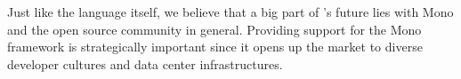 Just like the \fsharp{} language itself, we believe that a big part of \mbrace{}'s 
future lies with Mono and the open source community in general. Providing support
for the Mono framework is strategically important since it opens up the market
to diverse developer cultures and data center infrastructures.




%
%
%



